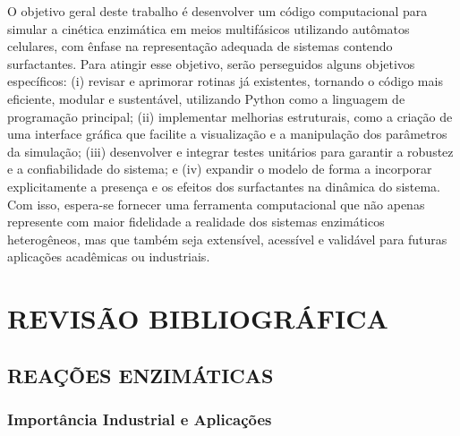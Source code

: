 \documentclass[12pt,oneside]{report}
\begin{document}
O objetivo geral deste trabalho é desenvolver um código computacional para simular a cinética enzimática em meios multifásicos utilizando autômatos celulares, com ênfase na representação adequada de sistemas contendo surfactantes. Para atingir esse objetivo, serão perseguidos alguns objetivos específicos: (i) revisar e aprimorar rotinas já existentes, tornando o código mais eficiente, modular e sustentável, utilizando Python como a linguagem de programação principal; (ii) implementar melhorias estruturais, como a criação de uma interface gráfica que facilite a visualização e a manipulação dos parâmetros da simulação; (iii) desenvolver e integrar testes unitários para garantir a robustez e a confiabilidade do sistema; e (iv) expandir o modelo de forma a incorporar explicitamente a presença e os efeitos dos surfactantes na dinâmica do sistema. Com isso, espera-se fornecer uma ferramenta computacional que não apenas represente com maior fidelidade a realidade dos sistemas enzimáticos heterogêneos, mas que também seja extensível, acessível e validável para futuras aplicações acadêmicas ou industriais.


\chapter{REVISÃO BIBLIOGRÁFICA}
\section{REAÇÕES ENZIMÁTICAS}


\subsection{Importância Industrial e Aplicações}
\end{document}
